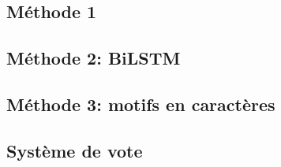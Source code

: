 \label{sec:methodes}

\subsection{Méthode 1}


\subsection{Méthode 2: BiLSTM}


\subsection{Méthode 3: motifs en caractères}


\subsection{Système de vote}

